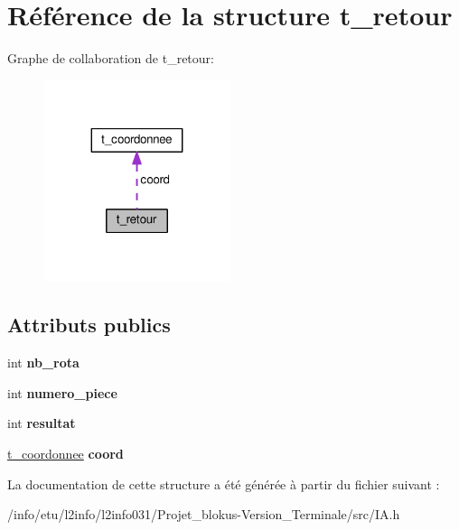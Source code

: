 \hypertarget{structt__retour}{}\section{Référence de la structure t\+\_\+retour}
\label{structt__retour}


Graphe de collaboration de t\+\_\+retour\+:\nopagebreak
\begin{figure}[H]
\begin{center}
\leavevmode
\includegraphics[width=155pt]{structt__retour__coll__graph}
\end{center}
\end{figure}
\subsection*{Attributs publics}
\begin{DoxyCompactItemize}
\item 
int {\bfseries nb\+\_\+rota}\hypertarget{structt__retour_ac2dfc0d49085b9d3829d88c46aa77c9a}{}\label{structt__retour_ac2dfc0d49085b9d3829d88c46aa77c9a}

\item 
int {\bfseries numero\+\_\+piece}\hypertarget{structt__retour_a0ee215e1631303db2201bf7372404dfd}{}\label{structt__retour_a0ee215e1631303db2201bf7372404dfd}

\item 
int {\bfseries resultat}\hypertarget{structt__retour_aca09b7cea68fd1ac3e7f20a09ff2a120}{}\label{structt__retour_aca09b7cea68fd1ac3e7f20a09ff2a120}

\item 
\hyperlink{structt__coordonnee}{t\+\_\+coordonnee} {\bfseries coord}\hypertarget{structt__retour_a60b1dd770298477ab55ed70a6db8b673}{}\label{structt__retour_a60b1dd770298477ab55ed70a6db8b673}

\end{DoxyCompactItemize}


La documentation de cette structure a été générée à partir du fichier suivant \+:\begin{DoxyCompactItemize}
\item 
/info/etu/l2info/l2info031/\+Projet\+\_\+blokus-\/\+Version\+\_\+\+Terminale/src/I\+A.\+h\end{DoxyCompactItemize}
